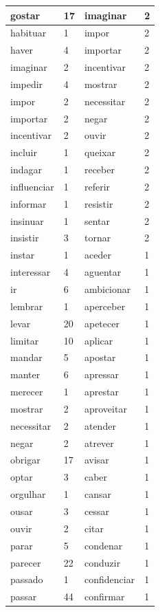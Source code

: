 \documentclass[output=paper,colorlinks,citecolor=brown]{langscibook}
\begin{document}
\begin{longtable}{ p{3cm} | p{1cm} | p{3cm} | p{1cm} }
		gostar & 17 & imaginar & 2\\\hline
		habituar & 1 & impor & 2\\\hline
		haver & 4 & importar & 2\\\hline
		imaginar & 2 & incentivar & 2\\\hline
		impedir & 4 & mostrar & 2\\\hline
		impor & 2 & necessitar & 2\\\hline
		importar & 2 & negar & 2\\\hline
		incentivar & 2 & ouvir & 2\\\hline
		incluir & 1 & queixar & 2\\\hline
		indagar & 1 & receber & 2\\\hline
		influenciar & 1 & referir & 2\\\hline
		informar & 1 & resistir & 2\\\hline
		insinuar & 1 & sentar & 2\\\hline
		insistir & 3 & tornar & 2\\\hline
		instar & 1 & aceder & 1\\\hline
		interessar & 4 & aguentar & 1\\\hline
		ir & 6 & ambicionar & 1\\\hline
		lembrar & 1 & aperceber & 1\\\hline
		levar & 20 & apetecer & 1\\\hline
		limitar & 10 & aplicar & 1\\\hline
		mandar & 5 & apostar & 1\\\hline
		manter & 6 & apressar & 1\\\hline
		merecer & 1 & aprestar & 1\\\hline
		mostrar & 2 & aproveitar & 1\\\hline
		necessitar & 2 & atender & 1\\\hline
		negar & 2 & atrever & 1\\\hline
		obrigar & 17 & avisar & 1\\\hline
		optar & 3 & caber & 1\\\hline
		orgulhar & 1 & cansar & 1\\\hline
		ousar & 3 & cessar & 1\\\hline
		ouvir & 2 & citar & 1\\\hline
		parar & 5 & condenar & 1\\\hline
		parecer & 22 & conduzir & 1\\\hline
		passado & 1 & confidenciar & 1\\\hline
		passar & 44 & confirmar & 1\\\hline

\end{longtable}
\end{document}
